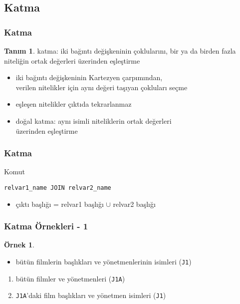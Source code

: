 \documentclass[dvipsnames]{beamer}
\theoremstyle{definition}
\newtheorem{tanim}[theorem]{Tanım}
\theoremstyle{example}
\newtheorem{ornek}[theorem]{Örnek}
\theoremstyle{plain}
\begin{document}
\subsection{Katma}

\begin{frame}[fragile]
  \frametitle{Katma}

  \begin{tanim}
    \alert{katma}: iki bağıntı değişkeninin çoklularını, bir ya da birden fazla\\
      niteliğin ortak değerleri üzerinden eşleştirme
  \end{tanim}

  \begin{itemize}
    \item iki bağıntı değişkeninin Kartezyen çarpımından,\\
      verilen nitelikler için aynı değeri taşıyan çokluları seçme
    \item eşleşen nitelikler çıktıda tekrarlanmaz

    \pause
    \item \alert{doğal katma}: aynı isimli niteliklerin ortak değerleri\\
      üzerinden eşleştirme
  \end{itemize}
\end{frame}

\begin{frame}[fragile]
  \frametitle{Katma}

  \begin{block}{Komut}
    \begin{lstlisting}
relvar1_name JOIN relvar2_name
    \end{lstlisting}
  \end{block}

  \pause
  \begin{itemize}
    \item çıktı başlığı = relvar1 başlığı $\cup$ relvar2 başlığı
  \end{itemize}
\end{frame}

\begin{frame}
  \frametitle{Katma Örnekleri - 1}

  \begin{ornek}
    \begin{itemize}
      \item bütün filmlerin başlıkları ve yönetmenlerinin isimleri (\texttt{J1})
    \end{itemize}

    \pause
    \begin{enumerate}
      \item bütün filmler ve yönetmenleri (\texttt{J1A})

      \pause
      \item \texttt{J1A}'daki film başlıkları ve yönetmen isimleri
         (\texttt{J1})
    \end{enumerate}
  \end{ornek}
\end{frame}
\end{document}
